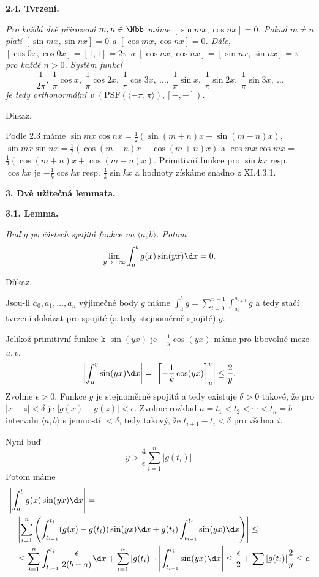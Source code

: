 \documentclass[12pt]{article}
\begin{document}
{\bf 2.4. Tvrzení.} {\em Pro každá dvě přirozená $m,n\in \Nbb$ máme  $[\sin mx,\cos nx]=0$. Pokud $m\neq n$ platí $[\sin mx,\sin nx]=0$ a
$[\cos mx,\cos nx]=0$. Dále, $[\cos 0x,\cos 0x]=[1,1]=2\pi$ a
 $[\cos nx,\cos nx]=[\sin nx,\sin nx]=\pi$ pro každé $n>0$. 
Systém funkcí
$$
\frac{1}{2\pi},\ \frac{1}{\pi}\cos{x},\ \frac{1}{\pi}\cos{2x},\ \frac{1}{\pi}\cos{3x},\ \dots,\ \frac{1}{\pi}\sin{x},\ \frac{1}{\pi}\sin{2x},\ \frac{1}{\pi}\sin{3x},\ \dots    
$$
je tedy orthonormální v $(\text{PSF}(\langle-\pi,\pi\rangle),[-,-])$.

Důkaz.} Podle 2.3 máme $\sin mx\cos nx=\frac12(\sin(m+n)x-\sin(m-n)x)$,
$\sin mx\sin nx=\frac12(\cos(m-n)x-\cos(m+n)x)$ a
$\cos mx\cos mx=$\newline $\frac12(\cos(m+n)x+\cos(m-n)x)$. Primitivní funkce pro
$\sin kx$ resp. $\cos kx$ je $-\frac1k\cos kx$ resp. $\frac1k\sin kx$ a hodnoty získáme snadno z
 XI.4.3.1.\sq


 \vskip10mm
 
 {\large\bf 3. Dvě užitečná lemmata.}

\bigskip

{\bf 3.1. Lemma.} {\em Buď $g$ po částech spojitá funkce na $\langle a,b\rangle$. Potom
$$
\lim_{y\to+\infty}\int_a^b g(x)\sin (yx) \d x=0.
$$

Důkaz.} Jsou-li $a_0,a_1,\dots ,a_n$ výjimečné body $g$ máme $\int_a^bg=
\sum_{i=0}^{n-1}\int_{a_i}^{a_{i+1}}g$ a tedy stačí tvrzení dokázat pro spojité (a tedy stejnoměrně spojité) $g$.

Jelikož primitivní funkce k $\sin (yx)$ je $-\frac1y\cos (yx)$ máme pro libovolné meze
 $u,v$,
$$
\left|\int_u^v \sin (yx) \d x\right|=\left|\left[-\frac1k\cos (yx)\right]_u^v\right|\leq \frac2y.
$$
Zvolme $\epsilon>0$. Funkce $g$ je stejnoměrně spojitá a tedy
existuje $\delta>0$ takové, že pro $|x-z|<\delta$ je $|g(x)-g(z)|<\epsilon$.
Zvolme rozklad $a=t_1<t_2<\cdots<t_n=b$ intervalu $\langle a,b\rangle$ s jemností $<\delta$, tedy takový, že $t_{i+1}-t_i<\delta$ pro všchna $i$.

Nyní buď
$$
y> \frac4{\epsilon}\sum_{i=1}^n|g(t_i)|.
$$
Potom máme
$$
\begin{aligned}
&\left|\int_a^bg(x)\sin (yx) \d x\right|=\\
&\quad\left|\sum_{i=1}^n\left(\int_{t_{i-1}}^{t_i}(g(x)-g(t_{i}))\sin (yx) \d x+
g(t_i)\int_{t_{i-1}}^{t_i}\sin (yx) \d x\right)\right|\leq\\
&\quad\leq \sum_{i=1}^n\int_{t_{i-1}}^{t_i}\frac{\epsilon}{2(b-a)}\d x +
\sum_{i=1}^n|g(t_i)|\cdot\left|\int_{t_{i-1}}^{t_i}\sin (yx)\d x\right|\leq
\frac{\epsilon}{2}+\sum|g(t_i)|\frac2y\leq \epsilon.
\end{aligned}
$$
\sq
\end{document}
